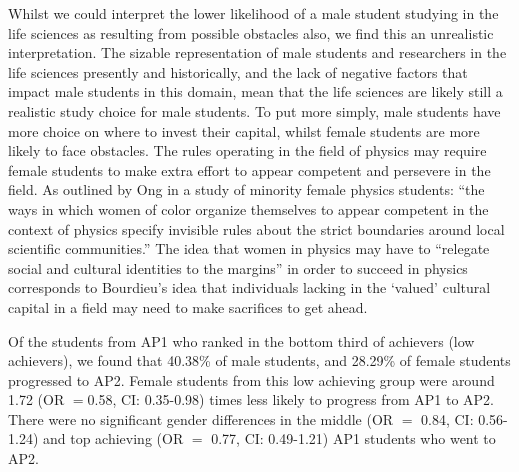 Whilst we could interpret the lower likelihood of a male student studying in the life sciences as resulting from possible obstacles also, we find this an unrealistic interpretation. The sizable representation of male students and researchers in the life sciences presently and historically, and the lack of negative factors that impact male students in this domain, mean that the life sciences are likely still a realistic study choice for male students. To put more simply, male students have more choice on where to invest their capital, whilst female students are more likely to face obstacles. The rules operating in the field of physics may require female students to make extra effort to appear competent and persevere in the field. As outlined by Ong\cite{ong2005body} in a study of minority female physics students: ``the ways in which women of color organize themselves to appear competent in the context of physics specify invisible rules about the strict boundaries around local scientific communities.'' The idea that women in physics may have to ``relegate social and cultural identities to the margins''\cite{ong2005body} in order to succeed in physics corresponds to Bourdieu's idea that individuals lacking in the `valued' cultural capital in a field may need to make sacrifices to get ahead.\cite{Bourdieu1984} 

Of the students from AP1 who ranked in the bottom third of achievers (low achievers), we found that 40.38\% of male students, and 28.29\% of female students progressed to AP2. Female students from this low achieving group were around 1.72 (OR $=$0.58, CI: 0.35-0.98) times less likely to progress from AP1 to AP2. There were no significant gender differences in the middle (OR $=$ 0.84, CI: 0.56-1.24) and top achieving (OR $=$ 0.77, CI: 0.49-1.21) AP1 students who went to AP2.

